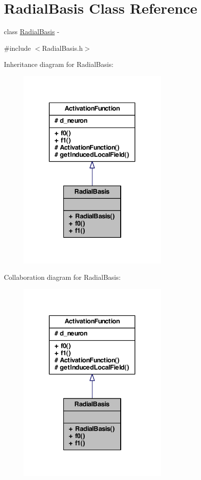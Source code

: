 \hypertarget{class_radial_basis}{
\section{RadialBasis Class Reference}
\label{class_radial_basis}
}


class \hyperlink{class_radial_basis}{RadialBasis} -\/  




{\ttfamily \#include $<$RadialBasis.h$>$}



Inheritance diagram for RadialBasis:
\nopagebreak
\begin{figure}[H]
\begin{center}
\leavevmode
\includegraphics[width=212pt]{class_radial_basis__inherit__graph}
\end{center}
\end{figure}


Collaboration diagram for RadialBasis:
\nopagebreak
\begin{figure}[H]
\begin{center}
\leavevmode
\includegraphics[width=212pt]{class_radial_basis__coll__graph}
\end{center}
\end{figure}
